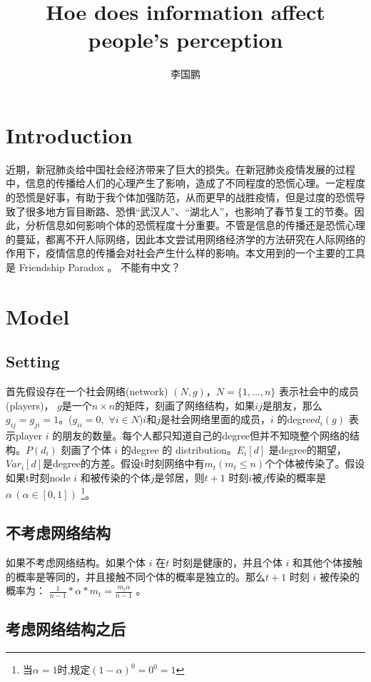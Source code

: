 \documentclass[a4paper]{article}
\author{李国鹏}
\title{Hoe does information affect people's perception }
\date{}
\begin{document}
\maketitle
\tableofcontents
\section{Introduction}
近期，新冠肺炎给中国社会经济带来了巨大的损失。在新冠肺炎疫情发展的过程中，信息的传播给人们的心理产生了影响，造成了不同程度的恐慌心理。一定程度的恐慌是好事，有助于我个体加强防范，从而更早的战胜疫情，但是过度的恐慌导致了很多地方盲目断路、恐惧“武汉人”、“湖北人”，也影响了春节复工的节奏。因此，分析信息如何影响个体的恐慌程度十分重要。不管是信息的传播还是恐慌心理的蔓延，都离不开人际网络，因此本文尝试用网络经济学的方法研究在人际网络的作用下，疫情信息的传播会对社会产生什么样的影响。本文用到的一个主要的工具是 Friendship Paradox 。
不能有中文？


\section{Model}
\subsection{Setting}
首先假设存在一个社会网络(network) $(N,g)$，$N=\{1,...,n\}$ 表示社会中的成员(players)， $g$是一个$n\times n$的矩阵，刻画了网络结构，如果$ij$是朋友，那么$g_{ij}=g_{ji}=1$。($g_{ii}=0,\,\,\forall i\in N$)$i$和$j$是社会网络里面的成员，$i$ 的degree$d_i(g)$ 表示player $i$ 的朋友的数量。每个人都只知道自己的degree但并不知晓整个网络的结构。$  P(d_i) $ 刻画了个体 $i$ 的degree 的 distribution。$E_i[d]$ 是degree的期望，$ Var_i[d]$是degree的方差。假设t时刻网络中有$m_t(m_t\leq n)$个个体被传染了。假设如果t时刻node $i$ 和被传染的个体$j$是邻居，则$t+1$ 时刻$i$被$j$传染的概率是$\alpha\,(\alpha\in [0,1])$ \footnote{当$\alpha=1$时,规定$(1-\alpha)^0=0^0=1$}。
\subsection{不考虑网络结构}
如果不考虑网络结构。如果个体 $i$ 在$t$ 时刻是健康的，并且个体 $i$ 和其他个体接触的概率是等同的，并且接触不同个体的概率是独立的。那么$t+1$ 时刻 $i$ 被传染的概率为：
$ \frac{1}{n-1}*\alpha*m_t=\frac{m_t\alpha}{n-1}  $ 。

\subsection{考虑网络结构之后 }
\end{document}

